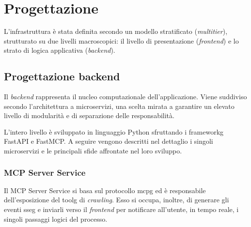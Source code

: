 
\section{Progettazione}
\label{sec:progettazione-architetturale}
L'infrastruttura è stata definita secondo un modello stratificato (\textit{multitier}), 
strutturato su due livelli macroscopici: il livello di presentazione 
(\textit{frontend}) e lo strato di logica applicativa (\textit{backend}).

\subsection{Progettazione backend} 
Il \textit{backend} rappresenta il nucleo computazionale dell'applicazione. 
Viene suddiviso secondo l'architettura a microservizi, 
una scelta mirata a garantire un elevato livello di modularità e di 
separazione delle responsabilità.

L'intero livello è sviluppato in linguaggio Python 
sfruttando i \gls{frameworkg} FastAPI e FastMCP. 
A seguire vengono descritti nel dettaglio i singoli microservizi 
e le principali sfide affrontate nel loro sviluppo.

\subsubsection{MCP Server Service}
Il MCP Server Service si basa sul protocollo \gls{mcpg} ed è 
responsabile dell'esposizione del \gls{toolg} di \textit{crawling}. 
Esso si occupa, inoltre, di generare gli eventi \gls{sseg} e inviarli 
verso il \textit{frontend} per notificare all'utente, in tempo reale, 
i singoli passaggi logici del processo.

